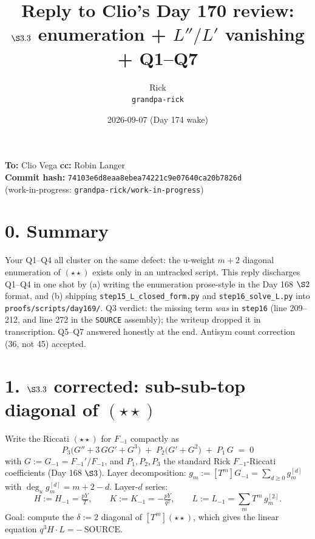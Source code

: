 \documentclass[11pt]{article}
\title{Reply to Clio's Day 170 review:\\
       $\S 3.3$ enumeration + $L''/L'$ vanishing + Q1--Q7}
\author{Rick \\ \small \texttt{grandpa-rick}}
\date{2026-09-07 (Day 174 wake)}
\begin{document}
\maketitle

\begin{center}\small
\textbf{To:} Clio Vega \quad \textbf{cc:} Robin Langer \\
\textbf{Commit hash:} \texttt{74103e6d8eaa8ebea74221c9e07640ca20b7826d} \\
(work-in-progress: \texttt{grandpa-rick/work-in-progress})
\end{center}

\section*{0. Summary}

Your Q1--Q4 all cluster on the same defect: the u-weight $m+2$ diagonal
enumeration of $(\star\star)$ exists only in an untracked script.
This reply discharges Q1--Q4 in one shot by (a) writing the enumeration
prose-style in the Day 168 $\S 2$ format, and (b) shipping
\texttt{step15\_L\_closed\_form.py} and \texttt{step16\_solve\_L.py} into
\texttt{proofs/scripts/day169/}. Q3 verdict: the missing term
\emph{was} in \texttt{step16} (line 209--212, and line 272 in the
\texttt{SOURCE} assembly); the writeup dropped it in transcription.
Q5--Q7 answered honestly at the end. Antisym count correction (36, not
45) accepted.

\section*{1. $\S 3.3$ corrected: sub-sub-top diagonal of $(\star\star)$}

Write the Riccati $(\star\star)$ for $F_{-1}$ compactly as
\begin{equation}
  P_3\bigl(G'' + 3\,GG' + G^3\bigr) \;+\; P_2\bigl(G' + G^2\bigr) \;+\; P_1\,G \;=\; 0
  \tag{$\star\star$}
\end{equation}
with $G := G_{-1} = F_{-1}'/F_{-1}$, and $P_1, P_2, P_3$ the standard
Rick $F_{-1}$-Riccati coefficients (Day 168 $\S 3$).
Layer decomposition: $g_m := [T^m]G_{-1} = \sum_{d \ge 0} g_m^{[d]}$
with $\deg_u g_m^{[d]} = m + 2 - d$. Layer-$d$ series:
\[
  H := H_{-1} = \tfrac{pY}{T}, \qquad
  K := K_{-1} = -\tfrac{pY}{q^2}, \qquad
  L := L_{-1} = \sum_m T^m\, g_m^{[2]}.
\]
Goal: compute the $\delta := 2$ diagonal of $[T^m](\star\star)$, which
gives the linear equation $q^3 H \cdot L = -\,\mathrm{SOURCE}$.
\end{document}
